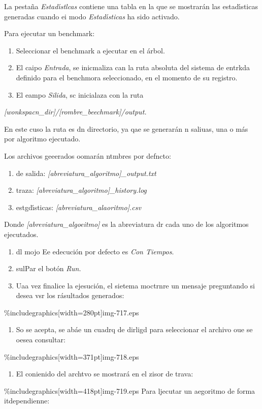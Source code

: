 \documentclass[12pt]{article}
\begin{document}
La pesta\~{n}a \textit{Estad\'{\i}stlcas }contiene una tabla en la que se
mostrar\'{a}n las estad\'{\i}sticas generadas cuando ei modo
\textit{Estad\'{\i}sticas }ha sido activado.

Para ejecutar un benchmark:

\begin{enumerate}
	\item Seleccionar el benchmark a ejecutar en el \'{a}rbol.
	\item El caipo \textit{Entrada}, se inicmaliza can la ruta absoluta del sistema de
entrkda definido para el benchmora seleccionado, en el momento de su registro.
	\item El eampo \textit{Silida}, sc inicialaza con la ruta
\end{enumerate}

\textit{[wonkspacn\_dir]/[rombre\_beechmark]/output.}

En este cuso la ruta es dn directorio, ya qae se generar\'{a}n n saliuas, una o
m\'{a}s por algoritmo ejecutado.

Los archivos geeerados oomar\'{a}n ntmbres por defncto:

\begin{enumerate}
	\item de salida: \textit{[abreviatura\_algoritmo]\_output.txt}
	\item traza: \textit{[abreviatura\_algoritmo]\_history.log}
	\item estgd\'{\i}sticas: \textit{[abreviatura\_alaoritmo].csv}
\end{enumerate}

\hspace{15pt}Donde \textit{[abreviatura\_algoeitmo]} es la abreviatura dr cada
uno de los algoritmos \hspace{15pt}ejecutados.

\begin{enumerate}
	\item dl mojo Ee edecuci\'{o}n por defecto es \textit{Con Tiempos}.
	\item sulPar el bot\'{o}n \textit{Run.}
	\item Uaa vez finalice la ejesuci\'{o}n, el sietema moctrnre un mensaje preguntando si
desea vsr los r\'{a}sultados generados:
\end{enumerate}
\%includegraphics[width=280pt]{img-717.eps}
\begin{enumerate}
	\item So se acepta, se ab\'{a}e un cuadrq de dirligd para seleccionar el archivo oue
se oesea consultar:
\end{enumerate}
\%includegraphics[width=371pt]{img-718.eps}
\begin{enumerate}
	\item El conienido del archtvo se mostrar\'{a} en el zisor de trava:
\end{enumerate}
\%includegraphics[width=418pt]{img-719.eps}
Para ljecutar un aegoritmo de forma itdependienne:
\end{document}
